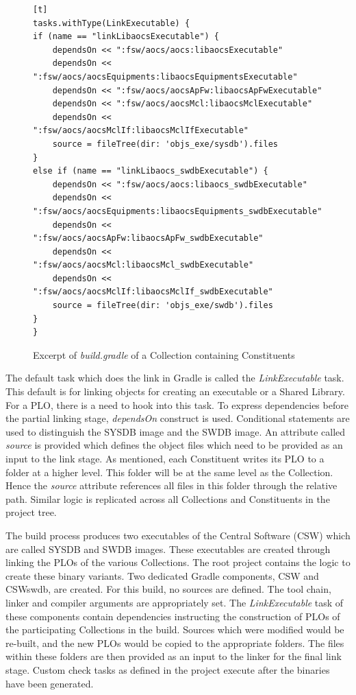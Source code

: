 \documentclass[12pt, a4paper, titlepage]{scrartcl}
\newcommand{\courierword}[1]{\textsf{\itshape #1}}{\fontfamily{pcr}\selectfont}%
\begin{document}
\begin{figure}[!ht]
\begin{lstlisting}[frame=single][t]
tasks.withType(LinkExecutable) {
if (name == "linkLibaocsExecutable") {
	dependsOn << ":fsw/aocs/aocs:libaocsExecutable"
	dependsOn << ":fsw/aocs/aocsEquipments:libaocsEquipmentsExecutable"
	dependsOn << ":fsw/aocs/aocsApFw:libaocsApFwExecutable"
	dependsOn << ":fsw/aocs/aocsMcl:libaocsMclExecutable"				
	dependsOn << ":fsw/aocs/aocsMclIf:libaocsMclIfExecutable"
	source = fileTree(dir: 'objs_exe/sysdb').files				
}
else if (name == "linkLibaocs_swdbExecutable") {
	dependsOn << ":fsw/aocs/aocs:libaocs_swdbExecutable"
	dependsOn << ":fsw/aocs/aocsEquipments:libaocsEquipments_swdbExecutable"
	dependsOn << ":fsw/aocs/aocsApFw:libaocsApFw_swdbExecutable"
	dependsOn << ":fsw/aocs/aocsMcl:libaocsMcl_swdbExecutable"				
	dependsOn << ":fsw/aocs/aocsMclIf:libaocsMclIf_swdbExecutable"
	source = fileTree(dir: 'objs_exe/swdb').files
}
}
\end{lstlisting}
\caption{Excerpt of \courierword{build.gradle} of a Collection containing Constituents}
\label{fig:collection-with-constituent}
\end{figure}
\par The default task which does the link in Gradle is called the \emph{LinkExecutable} task. This default is for linking objects for creating an executable or a Shared Library. For a PLO, there is a need to hook into this task. To express dependencies before the partial linking stage, \emph{dependsOn} construct is used. Conditional statements are used to distinguish the SYSDB image and the SWDB image. An attribute called \emph{source} is provided which defines the object files which need to be provided as an input to the link stage. As mentioned, each Constituent writes its PLO to a folder at a higher level. This folder will be at the same level as the Collection. Hence the \emph{source} attribute references all files in this folder through the relative path. Similar logic is replicated across all Collections and Constituents in the project tree. 
\par The build process produces two executables of the Central Software (CSW) which are called SYSDB and SWDB images. These executables are created through linking the PLOs of the various Collections. The root project contains the logic to create these binary variants. Two dedicated Gradle components, CSW and CSWswdb, are created. For this build, no sources are defined. The tool chain, linker and compiler arguments are appropriately set. The \emph{LinkExecutable} task of these components contain dependencies instructing the construction of PLOs of the participating Collections in the build. Sources which were modified would be re-built, and the new PLOs would be copied to the appropriate folders. The files within these folders are then provided as an input to the linker for the final link stage. Custom check tasks as defined in the project execute after the binaries have been generated. 
\end{document}
